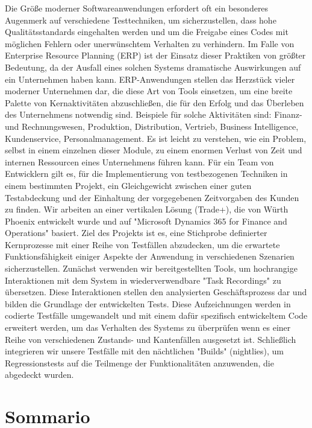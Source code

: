 Die Größe moderner Softwareanwendungen erfordert oft ein besonderes Augenmerk auf verschiedene Testtechniken, um sicherzustellen, dass hohe Qualitätsstandards eingehalten werden und um die Freigabe eines Codes mit möglichen Fehlern oder unerwünschtem Verhalten zu verhindern. 
Im Falle von Enterprise Resource Planning (ERP) ist der Einsatz dieser Praktiken von größter Bedeutung, da der Ausfall eines solchen Systems dramatische Auswirkungen auf ein Unternehmen haben kann. 
ERP-Anwendungen stellen das Herzstück vieler moderner Unternehmen dar, die diese Art von Tools einsetzen, um eine breite Palette von Kernaktivitäten abzuschließen, die für den Erfolg und das Überleben des Unternehmens notwendig sind. Beispiele für solche Aktivitäten sind: 
Finanz- und Rechnungswesen, Produktion, Distribution, Vertrieb, Business Intelligence, Kundenservice, Personalmanagement. 
Es ist leicht zu verstehen, wie ein Problem, selbst in einem einzelnen dieser Module, zu einem enormen Verlust von Zeit und internen Ressourcen eines Unternehmens führen kann. 
Für ein Team von Entwicklern gilt es, für die Implementierung von testbezogenen Techniken in einem bestimmten Projekt, ein Gleichgewicht zwischen einer guten Testabdeckung und der Einhaltung der vorgegebenen Zeitvorgaben des Kunden zu finden.
Wir arbeiten an einer vertikalen Lösung (Trade+), die von Würth Phoenix entwickelt wurde und auf "Microsoft Dynamics 365 for Finance and Operations" basiert. Ziel des Projekts ist es, eine Stichprobe definierter Kernprozesse mit einer Reihe von Testfällen abzudecken, um die erwartete Funktionsfähigkeit einiger Aspekte der Anwendung in verschiedenen Szenarien sicherzustellen. 
Zunächst verwenden wir bereitgestellten Tools, um hochrangige Interaktionen mit dem System in wiederverwendbare "Task Recordings" zu übersetzen. Diese Interaktionen stellen den analysierten Geschäftsprozess dar und bilden die Grundlage der entwickelten Tests.
Diese Aufzeichnungen werden in codierte Testfälle umgewandelt und mit einem dafür spezifisch entwickeltem Code erweitert werden, um das Verhalten des Systems zu überprüfen wenn es einer Reihe von verschiedenen Zustands- und Kantenfällen ausgesetzt ist. 
Schließlich integrieren wir unsere Testfälle mit den nächtlichen "Builds" (nightlies), um Regressionstests auf die Teilmenge der Funktionalitäten anzuwenden, die abgedeckt wurden. 

\chapter*{Sommario}

